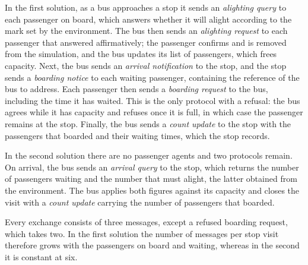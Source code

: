 \documentclass[a4paper,fleqn]{cas-sc}
\begin{document}
In the first solution, as a bus approaches a stop it sends an \emph{alighting
query} to each passenger on board, which answers whether it will alight
according to the mark set by the environment. The bus then sends an
\emph{alighting request} to each passenger that answered affirmatively; the
passenger confirms and is removed from the simulation, and the bus updates its
list of passengers, which frees capacity. Next, the bus sends an \emph{arrival
notification} to the stop, and the stop sends a \emph{boarding notice} to each
waiting passenger, containing the reference of the bus to address. Each
passenger then sends a \emph{boarding request} to the bus, including the time
it has waited. This is the only protocol with a refusal: the bus agrees while
it has capacity and refuses once it is full, in which case the passenger
remains at the stop. Finally, the bus sends a \emph{count update} to the stop
with the passengers that boarded and their waiting times, which the stop
records.

In the second solution there are no passenger agents and two protocols remain.
On arrival, the bus sends an \emph{arrival query} to the stop, which returns
the number of passengers waiting and the number that must alight, the latter
obtained from the environment. The bus applies both figures against its
capacity and closes the visit with a \emph{count update} carrying the number
of passengers that boarded.

Every exchange consists of three messages, except a refused boarding request,
which takes two. In the first solution the number of messages per stop visit
therefore grows with the passengers on board and waiting, whereas in the
second it is constant at six.
\end{document}
